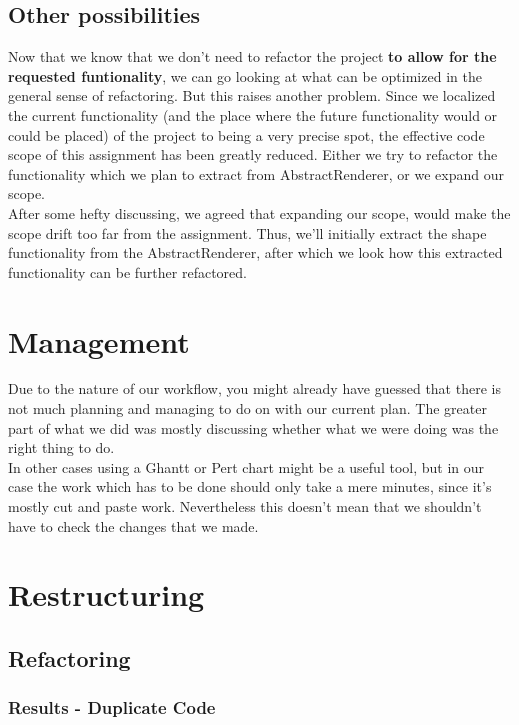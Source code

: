 \documentclass{article}
\begin{document}
\subsection{Other possibilities}

Now that we know that we don't need to refactor the project \textbf{to allow for the requested funtionality}, we can go looking at what can be optimized in the general sense of refactoring. But this raises another problem. Since we localized the current functionality (and the place where the future functionality would or could be placed) of the project to being a very precise spot, the effective code scope of this assignment has been greatly reduced. Either we try to refactor the functionality which we plan to extract from AbstractRenderer, or we expand our scope.\\

After some hefty discussing, we agreed that expanding our scope, would make the scope drift too far from the assignment. Thus, we'll initially extract the shape functionality from the AbstractRenderer, after which we look how this extracted functionality can be further refactored.


\section{Management}

Due to the nature of our workflow, you might already have guessed that there is not much planning and managing to do on with our current plan. The greater part of what we did was mostly discussing whether what we were doing was the right thing to do.\\

In other cases using a Ghantt or Pert chart might be a useful tool, but in our case the work which has to be done should only take a mere minutes, since it's mostly cut and paste work. Nevertheless this doesn't mean that we shouldn't have to check the changes that we made.

\section{Restructuring}

\subsection{Refactoring}

\subsubsection{Results - Duplicate Code}
\end{document}
